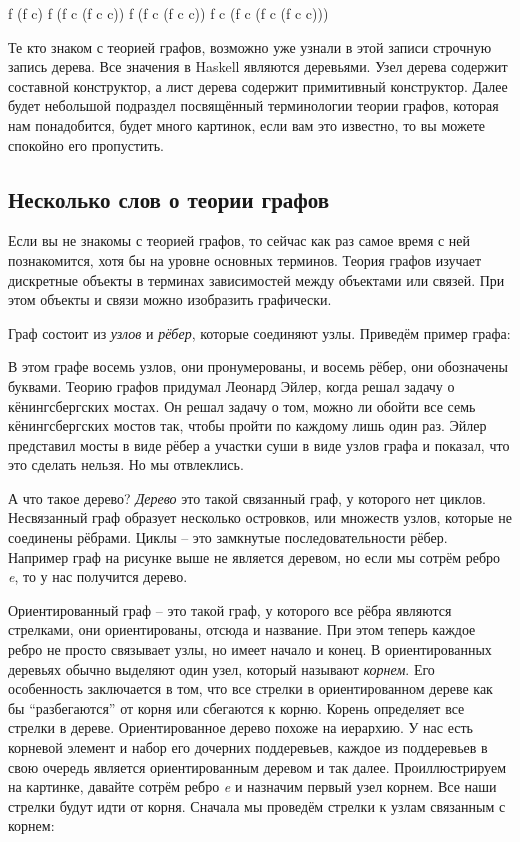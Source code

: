 \begin{code}
f (f c)
f (f c (f c c))
f (f c (f c c))
f c (f c (f c (f c c)))
\end{code}

Те кто знаком с теорией графов, возможно уже узнали в этой записи
строчную запись дерева. Все значения в Haskell являются деревьями. Узел
дерева содержит составной конструктор, а лист дерева содержит
примитивный конструктор. Далее будет небольшой подраздел посвящённый
терминологии теории графов, которая нам понадобится, будет много
картинок, если вам это известно, то вы можете спокойно его пропустить.

\subsection{Несколько слов о теории графов}

Если вы не знакомы с теорией графов, то сейчас как раз самое время с ней
познакомится, хотя бы на уровне основных терминов. Теория графов изучает
дискретные объекты в терминах зависимостей между объектами или связей.
При этом объекты и связи можно изобразить графически.

Граф состоит из \emph{узлов} и \emph{рёбер}, которые соединяют узлы.
Приведём пример графа:


В этом графе восемь узлов, они пронумерованы, и восемь рёбер, они
обозначены буквами. Теорию графов придумал Леонард Эйлер, когда решал
задачу о кёнингсбергских мостах. Он решал задачу о том, можно ли обойти
все семь кёнингсбергских мостов так, чтобы пройти по каждому лишь один
раз. Эйлер представил мосты в виде рёбер а участки суши в виде узлов
графа и показал, что это сделать нельзя. Но мы отвлеклись.

А что такое дерево? \emph{Дерево} это такой связанный граф, у которого
нет циклов. Несвязанный граф образует несколько островков, или множеств
узлов, которые не соединены рёбрами. Циклы -- это замкнутые
последовательности рёбер. Например граф на рисунке выше не является
деревом, но если мы сотрём ребро \emph{e}, то у нас получится дерево.

Ориентированный граф -- это такой граф, у которого все рёбра являются
стрелками, они ориентированы, отсюда и название. При этом теперь каждое
ребро не просто связывает узлы, но имеет начало и конец. В
ориентированных деревьях обычно выделяют один узел, который называют
\emph{корнем}. Его особенность заключается в том, что все стрелки в
ориентированном дереве как бы ``разбегаются'' от корня или сбегаются к
корню. Корень определяет все стрелки в дереве. Ориентированное дерево
похоже на иерархию. У нас есть корневой элемент и набор его дочерних
поддеревьев, каждое из поддеревьев в свою очередь является
ориентированным деревом и так далее. Проиллюстрируем на картинке,
давайте сотрём ребро \emph{e} и назначим первый узел корнем. Все наши
стрелки будут идти от корня. Сначала мы проведём стрелки к узлам
связанным с корнем:

